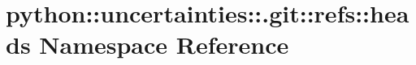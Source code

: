 \hypertarget{namespacepython_1_1uncertainties_1_1_8git_1_1refs_1_1heads}{
\section{python::uncertainties::.git::refs::heads Namespace Reference}
\label{namespacepython_1_1uncertainties_1_1_8git_1_1refs_1_1heads}
}
